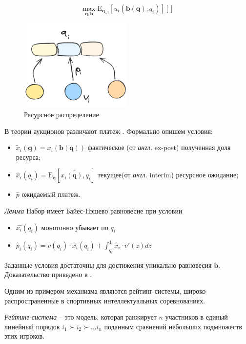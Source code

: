 \begin{equation}
    \max_{\mathbf{q},\mathbf{b}} \mathrm{E}_{\mathbf{q_{-i}}}\left[u_i(\mathbf{b}(\mathbf{q});q_i)\right] \left[\right] 
\end{equation}

\begin{figure}[h]
    \centering
    \includegraphics[width=0.5\textwidth]{assets/pedagogic/social/mech.excalidraw.png}
    \caption{Ресурсное распределение}
    \label{utility}
\end{figure}


В теории \cite{bulow1989simple} аукционов различают платеж . Формально опишем условия: \begin{itemize}
    \item $\tilde{x}_i(\mathbf{q}) = x_i(\mathbf{b}(\mathbf{q}))$ фактическое (от \textit{англ.} ex-post) полученная доля ресурса;
    \item $\hat{x}_i(q_i) = \mathrm{E}_\mathbf{q} \left[\tilde{x_i(\mathbf{q}),q_i}\right]$ текущее(от \textit{англ.} interim) ресурсное ожидание;
    \item $\hat{p}$ ожидаемый платеж.
\end{itemize}


\textit{Лемма} Набор имеет Байес-Нэшево равновесие при условии \begin{itemize}
    \item $\hat{x_i}(q_i)$ монотонно убывает по $q_i$
    \item $\hat{p}_i(q_i) = v(q_i) \cdot \hat{x}_i(q_i) + \int_{q_i}^1 \hat{x}_i \cdot v'(z) dz$
\end{itemize}
Заданные условия достаточны для достижения уникально равновесия $\mathbf{b}$. Доказательство приведено в \cite{myerson1981optimal}.


Одним из примером механизма являются рейтинг системы, широко распространенные в спортивных интеллектуальных соревнованиях.

\textit{Рейтинг-система} – это модель, которая ранжирует $n$
участников в единый линейный порядок $i_1 \succ i_2 \succ \dots i_n$
поданным сравнений небольших подмножеств этих игроков.
 
